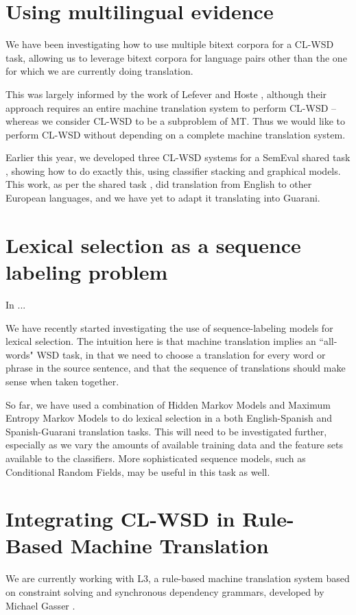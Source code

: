 \documentclass{article}
\begin{document}
\section{Using multilingual evidence}
We have been investigating how to use multiple bitext corpora for a CL-WSD
task, allowing us to leverage bitext corpora for language pairs other than the
one for which we are currently doing translation.

This was largely informed by the work of Lefever and Hoste
\cite{lefever-hoste-decock:2011:ACL-HLT2011}, although their approach requires
an entire machine translation system to perform CL-WSD -- whereas we consider
CL-WSD to be a subproblem of MT. Thus we would like to perform CL-WSD without
depending on a complete machine translation system.

Earlier this year, we developed three CL-WSD systems for a SemEval shared task
\cite{rudnick-liu-gasser:2013:SemEval-2013}, showing how to do exactly this,
using classifier stacking and graphical models. This work, as per the shared
task \cite{task10}, did translation from English to other European languages,
and we have yet to adapt it translating into Guarani.

\section{Lexical selection as a sequence labeling problem}
In \cite{rudnick-gasser:2013:HyTra-2013} ...

We have recently started investigating the use of sequence-labeling models for
lexical selection. The intuition here is that machine translation implies an
``all-words" WSD task, in that we need to choose a translation for every word
or phrase in the source sentence, and that the sequence of translations should
make sense when taken together.

So far, we have used a combination of Hidden Markov Models and Maximum Entropy
Markov Models to do lexical selection in a both English-Spanish and
Spanish-Guarani translation tasks. This will need to be investigated further,
especially as we vary the amounts of available training data and the feature
sets available to the classifiers. More sophisticated sequence models, such as
Conditional Random Fields, may be useful in this task as well.

\section{Integrating CL-WSD in Rule-Based Machine Translation}
We are currently working with L3, a rule-based machine translation system based
on constraint solving and synchronous dependency grammars, developed by Michael
Gasser \cite{gasser:sxdg} \cite{gasser:aflat2012}.
\end{document}
